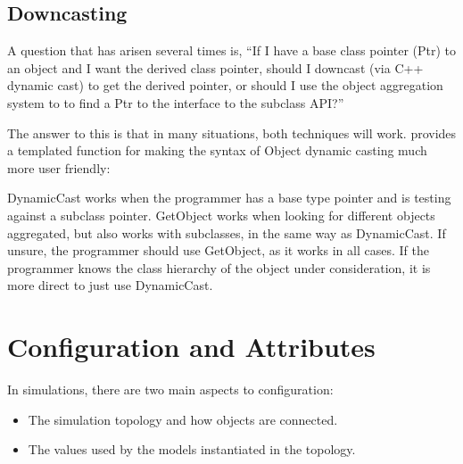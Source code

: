 \documentclass[letterpaper,10pt,english]{sphinxmanual}
\renewcommand{\sphinxcode}[1]{\texttt{\small{#1}}}
\begin{document}
\section{Downcasting}
\label{\detokenize{object-model:downcasting}}
A question that has arisen several times is, “If I have a base class pointer
(Ptr) to an object and I want the derived class pointer, should I downcast (via
C++ dynamic cast) to get the derived pointer, or should I use the object
aggregation system to \sphinxcode{\sphinxupquote{GetObject\textless{}\textgreater{} ()}} to find a Ptr to the interface
to the subclass API?”

The answer to this is that in many situations, both techniques will work.
 provides a templated function for making the syntax of Object
dynamic casting much more user friendly:

\begin{sphinxVerbatim}[commandchars=\\\{\}]
    
  
       
\end{sphinxVerbatim}

DynamicCast works when the programmer has a base type pointer and is testing
against a subclass pointer. GetObject works when looking for different objects
aggregated, but also works with subclasses, in the same way as DynamicCast. If
unsure, the programmer should use GetObject, as it works in all cases. If the
programmer knows the class hierarchy of the object under consideration, it is
more direct to just use DynamicCast.


\chapter{Configuration and Attributes}
\label{\detokenize{attributes:configuration-and-attributes}}\label{\detokenize{attributes:attributes}}\label{\detokenize{attributes::doc}}
In  simulations, there are two main aspects to configuration:
\begin{itemize}
\item {} 
The simulation topology and how objects are connected.

\item {} 
The values used by the models instantiated in the topology.

\end{itemize}
\end{document}
